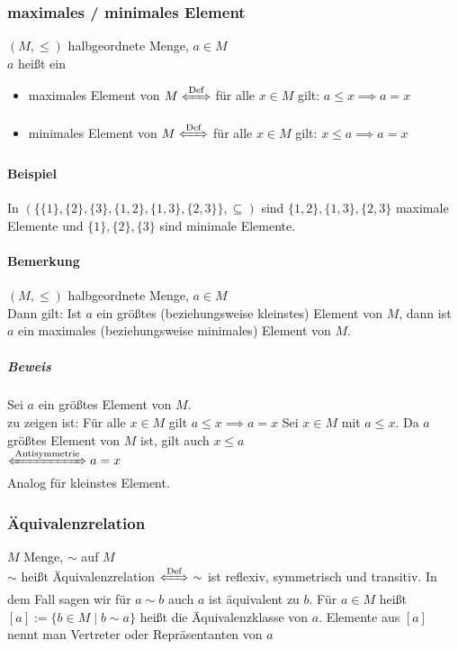 \documentclass[a4paper]{scrartcl}
\theoremstyle{definition}
\theoremstyle{plain}
\theoremstyle{plain}
\theoremstyle{remark}
\theoremstyle{remark}
\theoremstyle{remark}
\theoremstyle{remark}
\theoremstyle{remark}
\begin{document}
\subsubsection{maximales / minimales Element}
\label{sec-2-5-5}
$(M,\leq)$ halbgeordnete Menge, $a\in M$ \\
        $a$ heißt ein
\begin{itemize}
\item maximales Element von $M \xLeftrightarrow{\text{Def}}$ für alle $x\in M$ gilt: $a\leq x \implies a = x$
\item minimales Element von $M \xLeftrightarrow{\text{Def}}$ für alle $x\in M$ gilt: $x\leq a \implies a = x$
\end{itemize}
\paragraph{Beispiel}
\label{sec-2-5-5-1}
In $(\{\{1\},\{2\},\{3\},\{1,2\},\{1,3\},\{2,3\}\}, \subseteq)$ sind $\{1,2\},\{1,3\},\{2,3\}$ maximale Elemente und $\{1\},\{2\},\{3\}$ sind minimale Elemente.
\paragraph{Bemerkung}
\label{sec-2-5-5-2}
$(M,\leq)$ halbgeordnete Menge, $a\in M$ \\
         Dann gilt: Ist $a$ ein größtes (beziehungsweise kleinstes) Element von $M$, dann ist $a$ ein maximales (beziehungsweise minimales) Element von $M$.
\subparagraph{Beweis}
\label{sec-2-5-5-2-1}
Sei $a$ ein größtes Element von $M$. \\
          zu zeigen ist: Für alle $x\in M$ gilt $a\leq x \implies a = x$
Sei $x\in M$ mit $a\leq x$. Da $a$ größtes Element von $M$ ist, gilt auch $x\leq a$ \\
          $\xLeftrightarrow{\text{Antisymmetrie}} a = x$ \\
          Analog für kleinstes Element.
\subsubsection{Äquivalenzrelation}
\label{sec-2-5-6}
$M$ Menge, $\sim$ auf $M$ \\
        $\sim$ heißt Äquivalenzrelation $\xLeftrightarrow{\text{Def}}~\sim$ ist reflexiv, symmetrisch und transitiv.
In dem Fall sagen wir für $a\sim b$ auch $a$ ist äquivalent zu $b$. Für $a\in M$ heißt $[a]:=\{b\in M \mid b\sim a\}$ heißt die Äquivalenzklasse von $a$.
Elemente aus $[a]$ nennt man Vertreter oder Repräsentanten von $a$
\end{document}
